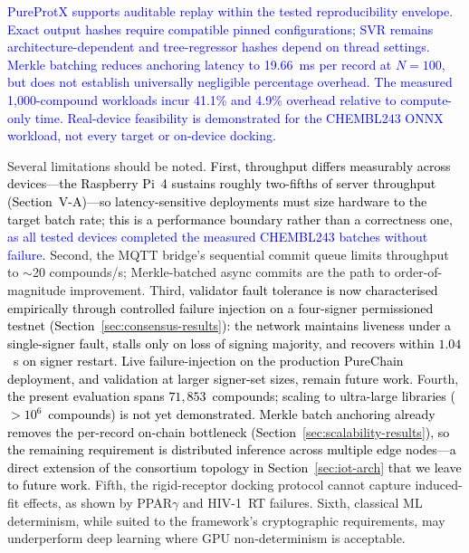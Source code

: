 \documentclass[conference]{IEEEtran}
\newcommand{\rev}[2]{\textcolor{blue}{#2}}
\begin{document}
\rev{R1.1, R1.4, R2.1, R2.2}{PureProtX supports auditable replay
within the tested reproducibility envelope. Exact output hashes
require compatible pinned configurations; SVR remains
architecture-dependent and tree-regressor hashes depend on
thread settings. Merkle batching reduces anchoring latency to
19.66~ms per record at $N{=}100$, but does not establish
universally negligible percentage overhead. The measured
1,000-compound workloads incur 41.1\% and 4.9\% overhead
relative to compute-only time. Real-device feasibility is
demonstrated for the CHEMBL243 ONNX workload, not every
target or on-device docking.}

Several limitations should be noted. \textcolor{black}{First, throughput
differs measurably across devices---the Raspberry Pi~4 sustains roughly
two-fifths of server throughput (Section~V-A)---so latency-sensitive
deployments must size hardware to the target batch rate; this is a
performance boundary rather than a correctness one, \rev{R1.1}{as all tested devices completed the measured CHEMBL243 batches without failure}.} Second, the MQTT bridge's
sequential commit queue limits throughput to $\sim$20 compounds/s;
Merkle-batched async commits are the path to order-of-magnitude improvement.
Third, \textcolor{black}{validator fault tolerance is now characterised
empirically through controlled failure injection on a
four-signer permissioned testnet
(Section~\ref{sec:consensus-results}): the network
maintains liveness under a single-signer fault, stalls
only on loss of signing majority, and recovers within
$1.04$~s on signer restart. Live failure-injection on the
production PureChain deployment, and validation at larger
signer-set sizes, remain future work.}
Fourth, \textcolor{black}{the present evaluation spans $71{,}853$~compounds;
scaling to ultra-large libraries ($>10^6$~compounds) is
not yet demonstrated. Merkle batch anchoring already
removes the per-record on-chain bottleneck
(Section~\ref{sec:scalability-results}), so the remaining
requirement is distributed inference across multiple edge
nodes---a direct extension of the consortium topology in
Section~\ref{sec:iot-arch} that we leave to future work.}
Fifth, the rigid-receptor docking protocol cannot
capture induced-fit effects, as shown by PPAR$\gamma$
and HIV-1~RT failures.
Sixth, classical ML determinism, while suited to the
framework's cryptographic requirements, may underperform
deep learning where GPU non-determinism is acceptable.


 
\end{document}
